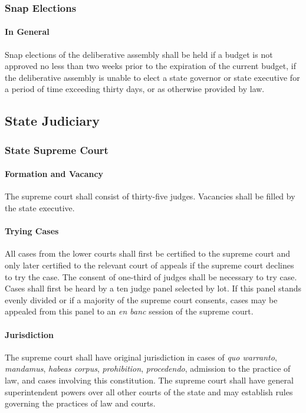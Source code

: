 \documentclass{article}
\begin{document}
\subsubsection{Snap Elections}
\paragraph{In General}
Snap elections of the deliberative assembly shall be held if a budget is not approved no less than two weeks prior to the expiration of the current budget, if the deliberative assembly is unable to elect a state governor or state executive for a period of time exceeding thirty days, or as otherwise provided by law.
\subsection{State Judiciary}
\subsubsection{State Supreme Court}
\paragraph{Formation and Vacancy}
The supreme court shall consist of thirty-five judges. Vacancies shall be filled by the state executive.
\paragraph{Trying Cases}
All cases from the lower courts shall first be certified to the supreme court and only later certified to the relevant court of appeals if the supreme court declines to try the case. The consent of one-third of judges shall be necessary to try case. Cases shall first be heard by a ten judge panel selected by lot. If this panel stands evenly divided or if a majority of the supreme court consents, cases may be appealed from this panel to an \textit{en banc} session of the supreme court.
\paragraph{Jurisdiction}
The supreme court shall have original jurisdiction in cases of \textit{quo warranto}, \textit{mandamus}, \textit{habeas corpus}, \textit{prohibition}, \textit{procedendo}, admission to the practice of law, and cases involving this constitution. The supreme court shall have general superintendent powers over all other courts of the state and may establish rules governing the practices of law and courts.
\end{document}
